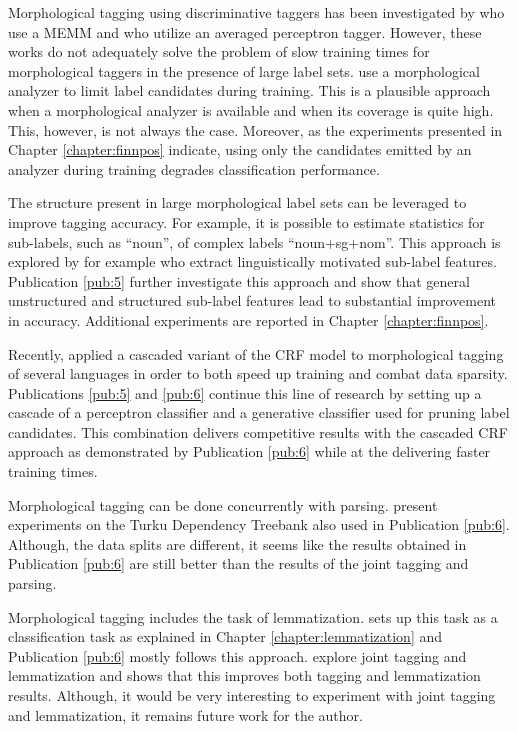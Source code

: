 Morphological tagging using discriminative taggers has been
investigated by \cite{Chrupala2008} who use a MEMM and
\cite{Spoustova2009} who utilize an averaged perceptron
tagger. However, these works do not adequately solve the problem of
slow training times for morphological taggers in the presence of large
label sets. \cite{Spoustova2009} use a morphological analyzer to limit
label candidates during training. This is a plausible approach when a
morphological analyzer is available and when its coverage is quite
high. This, however, is not always the case. Moreover, as the
experiments presented in Chapter \ref{chapter:finnpos} indicate, using
only the candidates emitted by an analyzer during training degrades
classification performance.

The structure present in large morphological label sets can be
leveraged to improve tagging accuracy. For example, it is possible to
estimate statistics for sub-labels, such as ``noun'', of complex
labels ``noun+sg+nom''. This approach is explored by for example
\cite{Spoustova2009} who extract linguistically motivated sub-label
features. Publication \ref{pub:5} further investigate this approach and
show that general unstructured and structured sub-label features lead
to substantial improvement in accuracy. Additional experiments are
reported in Chapter \ref{chapter:finnpos}.

Recently, \cite{Muller2013} applied a cascaded variant of the CRF
model to morphological tagging of several languages in order to both
speed up training and combat data sparsity. Publications \ref{pub:5} and
\ref{pub:6} continue this line of research by setting up a
cascade of a perceptron classifier and a generative classifier used
for pruning label candidates. This combination delivers competitive
results with the cascaded CRF approach as demonstrated by
Publication \ref{pub:6} while at the delivering faster training times.

Morphological tagging can be done concurrently with parsing.
\cite{Bohnet2013} present experiments on the Turku Dependency Treebank
also used in Publication \ref{pub:6}. Although, the data splits are
different, it seems like the results obtained in
Publication \ref{pub:6} are still better than the results of the joint
tagging and parsing.

Morphological tagging includes the task of
lemmatization. \cite{Chrupala2008} sets up this task as a
classification task as explained in Chapter
\ref{chapter:lemmatization} and Publication \ref{pub:6} mostly follows
this approach. \cite{Muller2015} explore joint tagging and
lemmatization and shows that this improves both tagging and
lemmatization results. Although, it would be very interesting to
experiment with joint tagging and lemmatization, it remains future
work for the author. 

